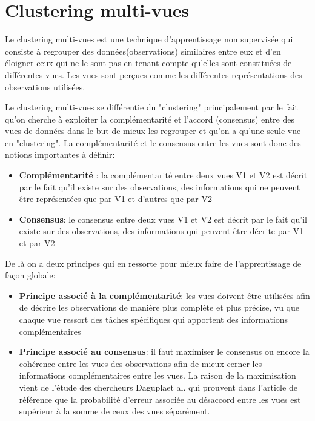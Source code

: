 \documentclass[12pt, french, latin.medieval, a4paper]{report}
\begin{document}
    \section{Clustering multi-vues}
    Le clustering multi-vues est une technique d'apprentissage non supervisée qui consiste à regrouper des données(observations) similaires entre eux et d'en éloigner ceux qui ne le sont pas en tenant compte qu'elles sont constituées de différentes vues. Les vues sont perçues comme les différentes représentations des observations utilisées. 
    
    Le clustering multi-vues se différentie du "clustering" principalement par le fait qu'on cherche à exploiter la complémentarité et l'accord (consensus) entre des vues de données dans le but de mieux les regrouper et qu'on a qu'une seule vue en "clustering". La complémentarité et le consensus entre les vues sont donc des notions importantes à définir:
    \begin{itemize}
        \item \textbf{Complémentarité} : la complémentarité entre deux vues V1 et V2 est décrit par le fait qu'il existe sur des observations, des informations qui ne peuvent être représentées que par V1 et d'autres que par V2
        \item \textbf{Consensus}: le consensus entre deux vues V1 et V2 est décrit par le fait qu'il existe sur des observations, des informations qui peuvent être décrite par V1 et par V2
    \end{itemize}
    
    De là on a deux principes qui en ressorte pour mieux faire de l'apprentissage de façon globale:
    \begin{itemize}
        \item \textbf{Principe associé à la complémentarité}: les vues doivent être utilisées afin de décrire les observations de manière plus complète et plus précise, vu que chaque vue ressort des tâches spécifiques qui apportent des informations complémentaires
        \item \textbf{Principe associé au consensus}: il faut maximiser le consensus ou encore la cohérence entre les vues des observations afin de mieux cerner les informations complémentaires entre les vues. La raison de la maximisation vient de l'étude des chercheurs Daguplaet al. qui prouvent dans l'article de référence \cite{dasgupta2001pac} que la probabilité d'erreur associée au désaccord entre les vues est supérieur à la somme de ceux des vues séparément.
    \end{itemize}
\end{document}
